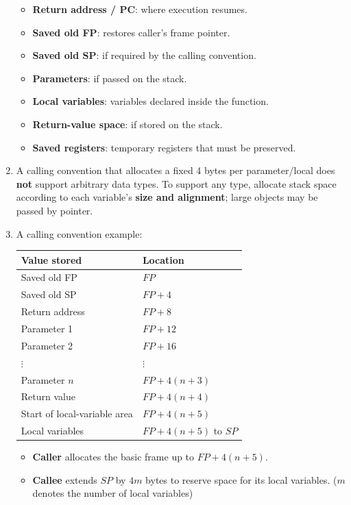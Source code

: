 \documentclass[10pt, landscape]{article}
\begin{document}
\begin{multicols}{4}
\begin{enumerate}
    \begin{itemize}
        \item \textbf{Return address / PC}: where execution resumes.
        \item \textbf{Saved old FP}: restores caller's frame pointer.
        \item \textbf{Saved old SP}: if required by the calling convention.
        \item \textbf{Parameters}: if passed on the stack.
        \item \textbf{Local variables}: variables declared inside the function.
        \item \textbf{Return-value space}: if stored on the stack.
        \item \textbf{Saved registers}: temporary registers that must be preserved.
    \end{itemize}
    \item A calling convention that allocates a fixed 4 bytes per parameter/local does \textbf{not} support arbitrary data types. To support any type, allocate stack space according to each variable's \textbf{size and alignment}; large objects may be passed by pointer.
    \item A calling convention example:\par
    {\centering
    \begin{tabular}{ll}
    \hline
    \textbf{Value stored} & \textbf{Location} \\
    \hline
    Saved old FP & $FP$ \\
    Saved old SP & $FP+4$ \\
    Return address & $FP+8$ \\
    Parameter 1 & $FP+12$ \\
    Parameter 2 & $FP+16$ \\
    $\vdots$ & $\vdots$ \\
    Parameter $n$ & $FP+4(n+3)$ \\
    Return value & $FP+4(n+4)$ \\
    Start of local-variable area & $FP+4(n+5)$ \\
    Local variables & $FP+4(n+5)$ to $SP$ \\
    \hline
    \end{tabular}\par}
    \begin{itemize}
        \item \textbf{Caller} allocates the basic frame up to $FP+4(n+5)$.
        \item \textbf{Callee} extends $SP$ by $4m$ bytes to reserve space for its local variables. ($m$ denotes the number of local variables)

\end{itemize}
\end{enumerate}
\end{multicols}
\end{document}
